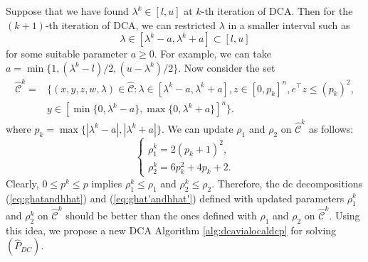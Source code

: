 \documentclass[3p]{elsarticle}
\begin{document}
Suppose that we have found $\lambda^k\in [l,u]$ at $k$-th iteration of DCA. Then for the $(k+1)$-th iteration of DCA, we can restricted $\lambda$ in a smaller interval such as \[\lambda \in [\lambda^k-a, \lambda^k + a] \subset [l,u]\] for some suitable parameter $a\geq 0$. For example, we can take $a=\min\{1, (\lambda^k-l)/2,(u-\lambda^k)/2 \}$. Now consider the set 
\begin{equation}
\label{eq:Chatk}
\begin{array}{rl}
\mathcal{\hat{C}}^k = &\{(x,y,z,w,\lambda)\in \mathcal{\hat{C}}: \lambda\in [\lambda^k-a, \lambda^k + a], z\in [0, p_k]^n, e^{\top}z\leq (p_k)^2, \\
& y\in [\min\{0,\lambda^k-a\},\max\{0,\lambda^k+a\}]^n \}.
\end{array}
\end{equation}
where $p_k=\max\{|\lambda^k-a|,|\lambda^k+a|\}$. We can update $\rho_1$ and $\rho_2$ on $\mathcal{\hat{C}}^k$ as follows:
\begin{equation}\label{eq:rho1kandrho2k}
\left\lbrace 
\begin{array}{l}
\rho_1^k =  2(p_k+1)^2, \\
\rho_2^k =  6p_k^2+4p_k+2.
\end{array}
\right. 
\end{equation}
Clearly, $0\leq p^k\leq p$ implies $\rho^k_1\leq \rho_1$ and $\rho^k_2\leq \rho_2$. Therefore, the dc decompositions (\ref{eq:ghatandhhat}) and (\ref{eq:ghat'andhhat'}) defined with updated parameters $\rho^k_1$ and $\rho^k_2$ on $\mathcal{\hat{C}}^k$ should be better than the ones defined with $\rho_1$ and $\rho_2$ on $\mathcal{\hat{C}}^k$. Using this idea, we propose a new DCA Algorithm \ref{alg:dcavialocaldcp} for solving $(\hat{P}_{DC})$.
\end{document}
